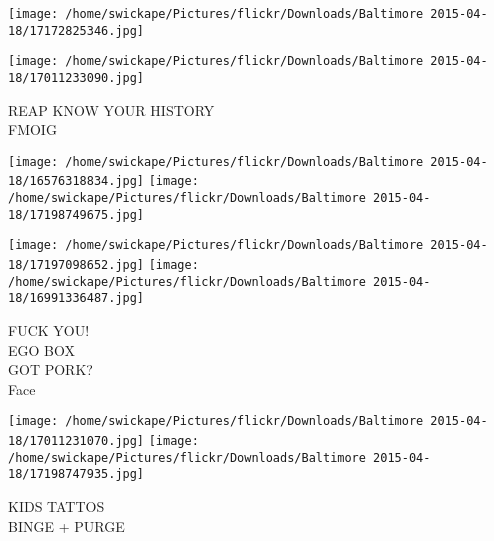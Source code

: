 \documentclass[10pt,letterpaper]{article}
\begin{document}
\texttt{[image: /home/swickape/Pictures/flickr/Downloads/Baltimore 2015-04-18/17172825346.jpg]}

\vspace{0.25in}
\texttt{[image: /home/swickape/Pictures/flickr/Downloads/Baltimore 2015-04-18/17011233090.jpg]}

REAP KNOW YOUR HISTORY\\
FMOIG\\
\pagebreak

\texttt{[image: /home/swickape/Pictures/flickr/Downloads/Baltimore 2015-04-18/16576318834.jpg]}
\texttt{[image: /home/swickape/Pictures/flickr/Downloads/Baltimore 2015-04-18/17198749675.jpg]}

\texttt{[image: /home/swickape/Pictures/flickr/Downloads/Baltimore 2015-04-18/17197098652.jpg]}
\texttt{[image: /home/swickape/Pictures/flickr/Downloads/Baltimore 2015-04-18/16991336487.jpg]}

FUCK YOU!\\
EGO BOX\\
GOT PORK?\\
Face\\
\pagebreak

\texttt{[image: /home/swickape/Pictures/flickr/Downloads/Baltimore 2015-04-18/17011231070.jpg]}
\texttt{[image: /home/swickape/Pictures/flickr/Downloads/Baltimore 2015-04-18/17198747935.jpg]}

KIDS TATTOS\\
BINGE + PURGE\\
\pagebreak
\end{document}
